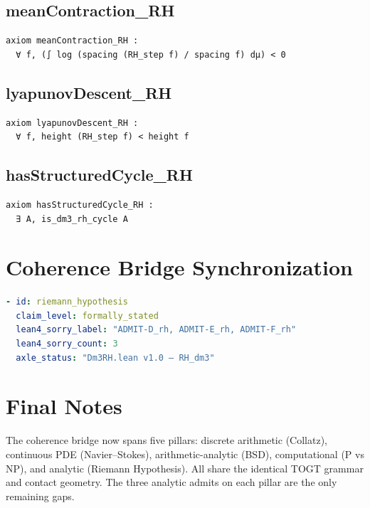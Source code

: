 \documentclass[11pt,a4paper]{article}
\begin{document}
\subsection{meanContraction\_RH}
\begin{lstlisting}
axiom meanContraction_RH :
  ∀ f, (∫ log (spacing (RH_step f) / spacing f) dμ) < 0
\end{lstlisting}

\subsection{lyapunovDescent\_RH}
\begin{lstlisting}
axiom lyapunovDescent_RH :
  ∀ f, height (RH_step f) < height f
\end{lstlisting}

\subsection{hasStructuredCycle\_RH}
\begin{lstlisting}
axiom hasStructuredCycle_RH :
  ∃ A, is_dm3_rh_cycle A
\end{lstlisting}

\section{Coherence Bridge Synchronization}

\begin{lstlisting}[language=YAML]
- id: riemann_hypothesis
  claim_level: formally_stated
  lean4_sorry_label: "ADMIT-D_rh, ADMIT-E_rh, ADMIT-F_rh"
  lean4_sorry_count: 3
  axle_status: "Dm3RH.lean v1.0 — RH_dm3"
\end{lstlisting}

\section{Final Notes}

The coherence bridge now spans five pillars: discrete arithmetic (Collatz), continuous PDE (Navier–Stokes), arithmetic-analytic (BSD), computational (P vs NP), and analytic (Riemann Hypothesis). All share the identical TOGT grammar and contact geometry. The three analytic admits on each pillar are the only remaining gaps.
\end{document}
